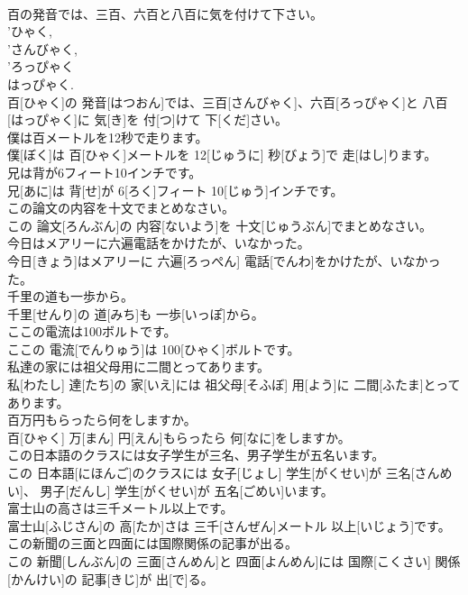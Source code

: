 \documentclass[8pt]{extreport}
\begin{document}
\begin{CJK}{UTF8}{min}
\\	百の発音では、三百、六百と八百に気を付けて下さい。	
\\	'ひゃく,
\\	'さんびゃく,
\\	'ろっぴゃく
\\	はっぴゃく.
\\	百[ひゃく]の 発音[はつおん]では、三百[さんびゃく]、六百[ろっぴゃく]と 八百[はっぴゃく]に 気[き]を 付[つ]けて 下[くだ]さい。
\\	僕は百メートルを12秒で走ります。	
\\	僕[ぼく]は 百[ひゃく]メートルを 12[じゅうに] 秒[びょう]で 走[はし]ります。
\\	兄は背が6フィート10インチです。	
\\	兄[あに]は 背[せ]が 6[ろく]フィート 10[じゅう]インチです。
\\	この論文の内容を十文でまとめなさい。	
\\	この 論文[ろんぶん]の 内容[ないよう]を 十文[じゅうぶん]でまとめなさい。
\\	今日はメアリーに六遍電話をかけたが、いなかった。	
\\	今日[きょう]はメアリーに 六遍[ろっぺん] 電話[でんわ]をかけたが、いなかった。
\\	千里の道も一歩から。
\\	千里[せんり]の 道[みち]も 一歩[いっぽ]から。
\\	ここの電流は100ボルトです。	
\\	ここの 電流[でんりゅう]は 100[ひゃく]ボルトです。
\\	私達の家には祖父母用に二間とってあります。	
\\	私[わたし] 達[たち]の 家[いえ]には 祖父母[そふぼ] 用[よう]に 二間[ふたま]とってあります。
\\	百万円もらったら何をしますか。	
\\	百[ひゃく] 万[まん] 円[えん]もらったら 何[なに]をしますか。
\\	この日本語のクラスには女子学生が三名、男子学生が五名います。	
\\	この 日本語[にほんご]のクラスには 女子[じょし] 学生[がくせい]が 三名[さんめい]、 男子[だんし] 学生[がくせい]が 五名[ごめい]います。
\\	富士山の高さは三千メートル以上です。	
\\	富士山[ふじさん]の 高[たか]さは 三千[さんぜん]メートル 以上[いじょう]です。
\\	この新聞の三面と四面には国際関係の記事が出る。	
\\	この 新聞[しんぶん]の 三面[さんめん]と 四面[よんめん]には 国際[こくさい] 関係[かんけい]の 記事[きじ]が 出[で]る。

\end{CJK}
\end{document}
